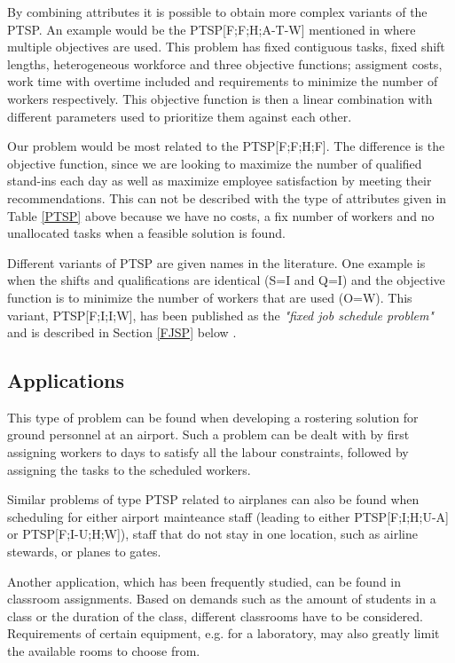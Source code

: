 By combining attributes it is possible to obtain more complex variants of the PTSP. An example would be the PTSP[F;F;H;A-T-W] mentioned in \cite{krishnamoorthy_2001} where multiple objectives are used. This problem has fixed contiguous tasks, fixed shift lengths, heterogeneous workforce and three objective functions; assigment costs, work time with overtime included and requirements to minimize the number of workers respectively. This objective function is then a linear combination with different parameters used to prioritize them against each other.

Our problem would be most related to the PTSP[F;F;H;F]. The difference is the objective function, since we are looking to maximize the number of qualified stand-ins each day as well as maximize employee satisfaction by meeting their recommendations. This can not be described with the type of attributes given in Table \ref{PTSP} above because we have no costs, a fix number of workers and no unallocated tasks when a feasible solution is found. 

Different variants of PTSP are given names in the literature. One example is when the shifts and qualifications are identical (S=I and Q=I) and the objective function is to minimize the number of workers that are used (O=W). This variant, PTSP[F;I;I;W], has been published as the \textit{"fixed job schedule problem"} and is described in Section \ref{FJSP} below \cite{krishnamoorthy_2001}.

\subsection{Applications}
This type of problem can be found when developing a rostering solution for ground personnel at an airport. Such a problem can be dealt with by first assigning workers to days to satisfy all the labour constraints, followed by assigning the tasks to the scheduled workers.

Similar problems of type PTSP related to airplanes can also be found when scheduling for either airport mainteance staff (leading to either PTSP[F;I;H;U-A] or PTSP[F;I-U;H;W]), staff that do not stay in one location, such as airline stewards, or planes to gates. 

Another application, which has been frequently studied, can be found in classroom assignments. Based on demands such as the amount of students in a class or the duration of the class, different classrooms have to be considered. Requirements of certain equipment, e.g. for a laboratory, may also greatly limit the available rooms to choose from.


